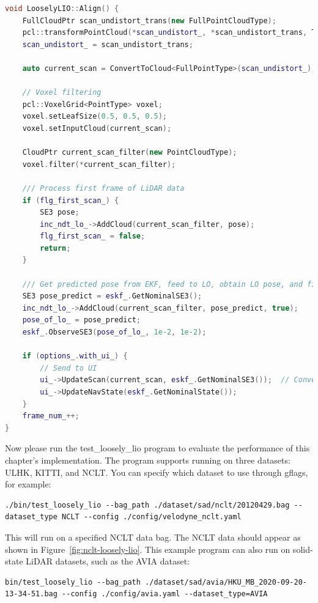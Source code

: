 \begin{lstlisting}[language=c++,caption=src/ch7/loosely_coupled_lio/loosly_lio.cc]
void LooselyLIO::Align() {
	FullCloudPtr scan_undistort_trans(new FullPointCloudType);
	pcl::transformPointCloud(*scan_undistort_, *scan_undistort_trans, TIL_.matrix());
	scan_undistort_ = scan_undistort_trans;
	
	auto current_scan = ConvertToCloud<FullPointType>(scan_undistort_);
	
	// Voxel filtering
	pcl::VoxelGrid<PointType> voxel;
	voxel.setLeafSize(0.5, 0.5, 0.5);
	voxel.setInputCloud(current_scan);
	
	CloudPtr current_scan_filter(new PointCloudType);
	voxel.filter(*current_scan_filter);
	
	/// Process first frame of LiDAR data
	if (flg_first_scan_) {
		SE3 pose;
		inc_ndt_lo_->AddCloud(current_scan_filter, pose);
		flg_first_scan_ = false;
		return;
	}
	
	/// Get predicted pose from EKF, feed to LO, obtain LO pose, and finally integrate into EKF
	SE3 pose_predict = eskf_.GetNominalSE3();
	inc_ndt_lo_->AddCloud(current_scan_filter, pose_predict, true);
	pose_of_lo_ = pose_predict;
	eskf_.ObserveSE3(pose_of_lo_, 1e-2, 1e-2);
	
	if (options_.with_ui_) {
		// Send to UI
		ui_->UpdateScan(current_scan, eskf_.GetNominalSE3());  // Convert to Lidar Pose for UI
		ui_->UpdateNavState(eskf_.GetNominalState());
	}
	frame_num_++;
}
\end{lstlisting}

Now please run the test\_loosely\_lio program to evaluate the performance of this chapter's implementation. The program supports running on three datasets: ULHK, KITTI, and NCLT. You can specify which dataset to use through gflags, for example:
\begin{lstlisting}
./bin/test_loosely_lio --bag_path ./dataset/sad/nclt/20120429.bag --dataset_type NCLT --config ./config/velodyne_nclt.yaml
\end{lstlisting}

This will run on a specified NCLT data bag. The NCLT data should appear as shown in Figure~\ref{fig:nclt-loosely-lio}. This example program can also run on solid-state LiDAR datasets, such as the AVIA dataset:

\begin{lstlisting}
bin/test_loosely_lio --bag_path ./dataset/sad/avia/HKU_MB_2020-09-20-13-34-51.bag --config ./config/avia.yaml --dataset_type=AVIA
\end{lstlisting}

